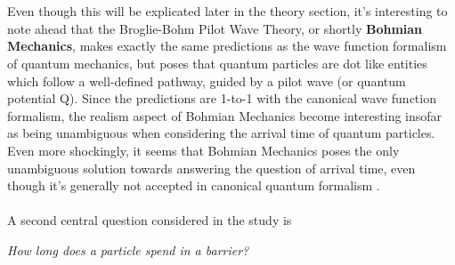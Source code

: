 \\\\
Even though this will be explicated later in the theory section, it's interesting to note ahead that the Broglie-Bohm Pilot Wave Theory, or shortly \textbf{Bohmian Mechanics}, makes exactly the same predictions as the wave function formalism of quantum mechanics, but poses that quantum particles are dot like entities which follow a well-defined pathway, guided by a pilot wave (or quantum potential Q). Since the predictions are 1-to-1 with the canonical wave function formalism, the realism aspect of Bohmian Mechanics become interesting insofar as being unambiguous when considering the arrival time of quantum particles. Even more shockingly, it seems that Bohmian Mechanics poses the only unambiguous solution towards answering the question of arrival time, even though it's generally not accepted in canonical quantum formalism \cite{Das2019}.
\\\\
A second central question considered in the study is

\begin{center}
    \textit{How long does a particle spend in a barrier?}
\end{center}

